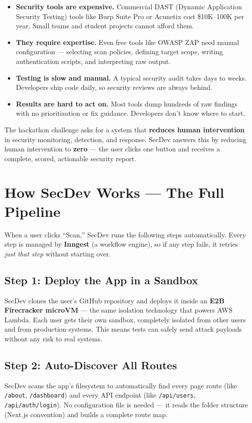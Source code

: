 \documentclass[11pt, a4paper]{article}
\begin{document}
\begin{itemize}[leftmargin=1.4em, itemsep=4pt]
  \item \textbf{Security tools are expensive.} Commercial DAST (Dynamic Application Security Testing) tools like Burp Suite Pro or Acunetix cost \$10K--100K per year. Small teams and student projects cannot afford them.
  \item \textbf{They require expertise.} Even free tools like OWASP ZAP need manual configuration --- selecting scan policies, defining target scope, writing authentication scripts, and interpreting raw output.
  \item \textbf{Testing is slow and manual.} A typical security audit takes days to weeks. Developers ship code daily, so security reviews are always behind.
  \item \textbf{Results are hard to act on.} Most tools dump hundreds of raw findings with no prioritization or fix guidance. Developers don't know where to start.
\end{itemize}

The hackathon challenge asks for a system that \textbf{reduces human intervention} in security monitoring, detection, and response. SecDev answers this by reducing human intervention to \textbf{zero} --- the user clicks one button and receives a complete, scored, actionable security report.

\section{How SecDev Works --- The Full Pipeline}

When a user clicks ``Scan,'' SecDev runs the following steps automatically. Every step is managed by \textbf{Inngest} (a workflow engine), so if any step fails, it retries \textit{just that step} without starting over.

\subsection{Step 1: Deploy the App in a Sandbox}
SecDev clones the user's GitHub repository and deploys it inside an \textbf{E2B Firecracker microVM} --- the same isolation technology that powers AWS Lambda. Each user gets their own sandbox, completely isolated from other users and from production systems. This means tests can safely send attack payloads without any risk to real systems.

\subsection{Step 2: Auto-Discover All Routes}
SecDev scans the app's filesystem to automatically find every page route (like \texttt{/about}, \texttt{/dashboard}) and every API endpoint (like \texttt{/api/users}, \texttt{/api/auth/login}). No configuration file is needed --- it reads the folder structure (Next.js convention) and builds a complete route map.
\end{document}
